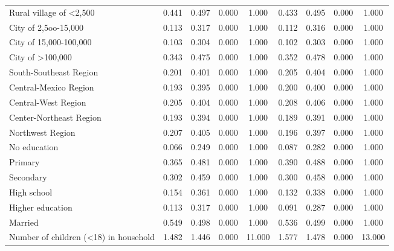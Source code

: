 \begin{table}[h!]
\begin{center}
{\begin{tabular}{l*{2}{cccc}}
Rural village of <2,500&       0.441&       0.497&       0.000&       1.000&       0.433&       0.495&       0.000&       1.000\\
City of 2,5oo-15,000&       0.113&       0.317&       0.000&       1.000&       0.112&       0.316&       0.000&       1.000\\
City of 15,000-100,000&       0.103&       0.304&       0.000&       1.000&       0.102&       0.303&       0.000&       1.000\\
City of >100,000    &       0.343&       0.475&       0.000&       1.000&       0.352&       0.478&       0.000&       1.000\\
South-Southeast Region&       0.201&       0.401&       0.000&       1.000&       0.205&       0.404&       0.000&       1.000\\
Central-Mexico Region&       0.193&       0.395&       0.000&       1.000&       0.200&       0.400&       0.000&       1.000\\
Central-West Region &       0.205&       0.404&       0.000&       1.000&       0.208&       0.406&       0.000&       1.000\\
Center-Northeast Region&       0.193&       0.394&       0.000&       1.000&       0.189&       0.391&       0.000&       1.000\\
Northwest Region    &       0.207&       0.405&       0.000&       1.000&       0.196&       0.397&       0.000&       1.000\\
No education        &       0.066&       0.249&       0.000&       1.000&       0.087&       0.282&       0.000&       1.000\\
Primary             &       0.365&       0.481&       0.000&       1.000&       0.390&       0.488&       0.000&       1.000\\
Secondary           &       0.302&       0.459&       0.000&       1.000&       0.300&       0.458&       0.000&       1.000\\
High school         &       0.154&       0.361&       0.000&       1.000&       0.132&       0.338&       0.000&       1.000\\
Higher education    &       0.113&       0.317&       0.000&       1.000&       0.091&       0.287&       0.000&       1.000\\
Married             &       0.549&       0.498&       0.000&       1.000&       0.536&       0.499&       0.000&       1.000\\
Number of children (<18) in household&       1.482&       1.446&       0.000&      11.000&       1.577&       1.478&       0.000&      13.000\\

\end{tabular}}
\end{center}
\end{table}
